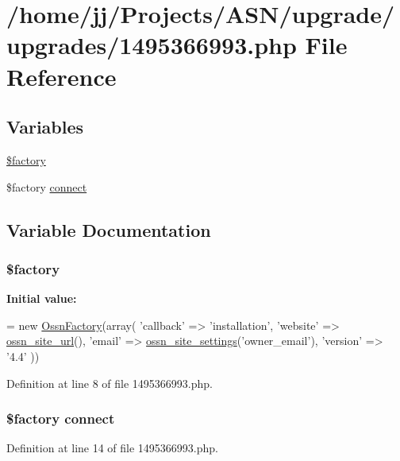 \hypertarget{1495366993_8php}{}\section{/home/jj/\+Projects/\+A\+S\+N/upgrade/upgrades/1495366993.php File Reference}
\label{1495366993_8php}
\subsection*{Variables}
\begin{DoxyCompactItemize}
\item 
\hyperlink{1495366993_8php_a099b374dc664ee043fffcd6ea05e3e70}{\$factory}
\item 
\$factory \hyperlink{1495366993_8php_a3fdbedd7713e458f25fcf7dc1f562a3d}{connect}
\end{DoxyCompactItemize}


\subsection{Variable Documentation}
\subsubsection[{\texorpdfstring{\$factory}{$factory}}]{\setlength{\rightskip}{0pt plus 5cm}\$factory}\hypertarget{1495366993_8php_a099b374dc664ee043fffcd6ea05e3e70}{}\label{1495366993_8php_a099b374dc664ee043fffcd6ea05e3e70}
{\bfseries Initial value\+:}
\begin{DoxyCode}
= \textcolor{keyword}{new} \hyperlink{class_ossn_factory}{OssnFactory}(array(
        \textcolor{stringliteral}{'callback'} => \textcolor{stringliteral}{'installation'},
        \textcolor{stringliteral}{'website'} => \hyperlink{ossn_8lib_8system_8php_a2f12f9244f99eccd1225afb76ef2ab65}{ossn\_site\_url}(),
        \textcolor{stringliteral}{'email'} => \hyperlink{ossn_8lib_8system_8php_a610e2045b8a86c09f777b4d82e24e34c}{ossn\_site\_settings}(\textcolor{stringliteral}{'owner\_email'}),
        \textcolor{stringliteral}{'version'} => \textcolor{stringliteral}{'4.4'}
))
\end{DoxyCode}


Definition at line 8 of file 1495366993.\+php.

\subsubsection[{\texorpdfstring{connect}{connect}}]{\setlength{\rightskip}{0pt plus 5cm}\$factory connect}\hypertarget{1495366993_8php_a3fdbedd7713e458f25fcf7dc1f562a3d}{}\label{1495366993_8php_a3fdbedd7713e458f25fcf7dc1f562a3d}


Definition at line 14 of file 1495366993.\+php.

